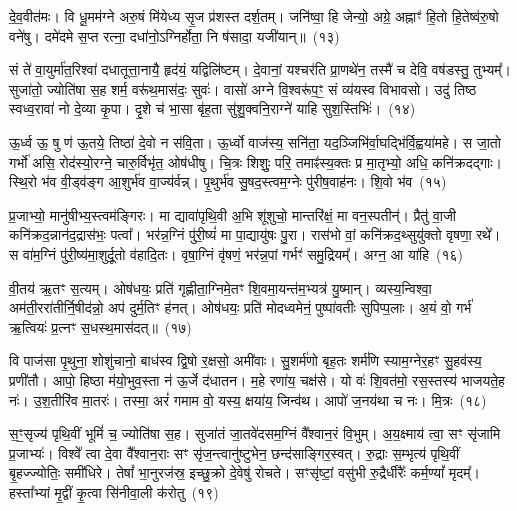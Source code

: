 दे॒व॒वीत॑मः। वि धू॒मम॑ग्ने अरु॒षं मि॑येध्य सृ॒ज प्र॑शस्त दर्\mbox{}श॒तम्। जनि॑ष्वा॒ हि जेन्यो॒ अग्रे॒ अह्नाꣳ॑ हि॒तो हि॒तेष्व॑रु॒षो वने॑षु। दमे॑दमे स॒प्त रत्ना॒ दधा॑नो॒\-ऽग्निर्\mbox{}होता॒ नि ष॑सादा॒ यजी॑यान्॥~(१३)

{\anuvakamend[{स्थ॒ ई॒धे॒ शोच॑स्व स॒प्तविꣳ॑शतिश्च}]}%

सं ते॑ वा॒युर्मा॑त॒रिश्वा॑ दधातूत्ता॒नायै॒ हृद॑यं॒ यद्विलि॑ष्टम्। दे॒वानां॒ यश्चर॑ति प्रा॒णथे॑न॒ तस्मै॑ च देवि॒ वष॑डस्तु॒ तुभ्यम्᳚। सुजा॑तो॒ ज्योति॑षा स॒ह शर्म॒ वरू॑थ॒मास॑दः॒ सुवः॑। वासो॑ अग्ने वि॒श्वरू॑प॒ꣳ॒ सं व्य॑यस्व विभावसो। उदु॑ तिष्ठ स्वध्व॒रावा॑ नो दे॒व्या कृ॒पा। दृ॒शे च॑ भा॒सा बृ॑ह॒ता सु॑शु॒क्वनि॒राग्ने॑ याहि सुश॒स्तिभिः॑।~(१४)

ऊ॒र्ध्व ऊ॒ षु ण॑ ऊ॒तये॒ तिष्ठा॑ दे॒वो न स॑वि॒ता। ऊ॒र्ध्वो वाज॑स्य॒ सनि॑ता॒ यद॒ञ्जिभि॑र्वा॒घद्भि॑र्वि॒ह्वया॑महे। स जा॒तो गर्भो॑ असि॒ रोद॑स्यो॒रग्ने॒ चारु॒र्विभृ॑त॒ ओष॑धीषु। चि॒त्रः शिशुः॒ परि॒ तमाꣴ॑स्य॒क्तः प्र मा॒तृभ्यो॒ अधि॒ कनि॑क्रदद्गाः। स्थि॒रो भ॑व वी॒ड्व॑ङ्ग आ॒शुर्भ॑व वा॒ज्य॑र्वन्न्। पृ॒थुर्भ॑व सु॒षद॒स्त्वम॒ग्नेः पु॑रीष॒वाह॑नः। शि॒वो भ॑व~(१५)

प्र॒जाभ्यो॒ मानु॑षीभ्य॒स्त्वम॑ङ्गिरः। मा द्यावा॑पृथि॒वी अ॒भि शू॑शुचो॒ मान्तरि॑क्षं॒ मा वन॒स्पतीन्॑। प्रैतु॑ वा॒जी कनि॑क्रद॒न्नान॑द॒द्रास॑भः॒ पत्वा᳚। भर॑न्न॒ग्निं पु॑री॒ष्यं॑ मा पा॒द्यायु॑षः पु॒रा। रास॑भो वां॒ कनि॑क्रद॒थ्सुयु॑क्तो वृषणा॒ रथे᳚। स वा॑म॒ग्निं पु॑री॒ष्य॑मा॒शुर्दू॒तो व॑हादि॒तः। वृषा॒ग्निं वृ॑षणं॒ भर॑न्न॒पां गर्भꣳ॑ समु॒द्रियम्᳚। अग्न॒ आ या॑हि~(१६)

वी॒तय॑ ऋ॒तꣳ स॒त्यम्। ओष॑धयः॒ प्रति॑ गृह्णीता॒ग्निमे॒तꣳ शि॒वमा॒यन्त॑म॒भ्यत्र॑ यु॒ष्मान्। व्यस्य॒न्विश्वा॒ अम॑ती॒ररा॑तीर्नि॒षीद॑न्नो॒ अप॑ दुर्म॒तिꣳ ह॑नत्। ओष॑धयः॒ प्रति॑ मोदध्वमेनं॒ पुष्पा॑वतीः सुपिप्प॒लाः। अ॒यं वो॒ गर्भ॑ ऋ॒त्वियः॑ प्र॒त्नꣳ स॒धस्थ॒मास॑दत्॥~(१७)

{\anuvakamend[{सु॒श॒स्तिभिः॑ शि॒वो भ॑व याहि॒ षट्त्रिꣳ॑शच्च}]}%

वि पाज॑सा पृ॒थुना॒ शोशु॑चानो॒ बाध॑स्व द्वि॒षो र॒क्षसो॒ अमी॑वाः। सु॒शर्म॑णो बृह॒तः शर्म॑णि स्याम॒ग्नेर॒हꣳ सु॒हव॑स्य॒ प्रणी॑तौ। आपो॒ हि\-ष्ठा म॑यो॒भुव॒स्ता न॑ ऊ॒र्जे द॑धातन। म॒हे रणा॑य॒ चक्ष॑से। यो वः॑ शि॒वत॑मो॒ रस॒स्तस्य॑ भाजयते॒ह नः॑। उ॒श॒तीरि॑व मा॒तरः॑। तस्मा॒ अरं॑ गमाम वो॒ यस्य॒ क्षया॑य॒ जिन्व॑थ। आपो॑ ज॒नय॑था च नः। मि॒त्रः~(१८)

स॒ꣳ॒सृज्य॑ पृथि॒वीं भूमिं॑ च॒ ज्योति॑षा स॒ह। सुजा॑तं जा॒तवे॑दसम॒ग्निं वै᳚श्वान॒रं वि॒भुम्। अ॒य॒क्ष्माय॑ त्वा॒ सꣳ सृ॑जामि प्र॒जाभ्यः॑। विश्वे᳚ त्वा दे॒वा वै᳚श्वान॒राः सꣳ सृ॑ज॒न्त्वानु॑ष्टुभेन॒ छन्द॑साङ्गिर॒स्वत्। रु॒द्राः स॒म्भृत्य॑ पृथि॒वीं बृ॒हज्ज्योतिः॒ समी॑धिरे। तेषां᳚ भा॒नुरज॑स्र॒ इच्छु॒क्रो दे॒वेषु॑ रोचते। सꣳसृ॑ष्टां॒ वसु॑भी रु॒द्रैर्धीरैः᳚ कर्म॒ण्यां᳚ मृदम्᳚। हस्ता᳚भ्यां मृ॒द्वीं कृ॒त्वा सि॑नीवा॒ली क॑रोतु~(१९)

